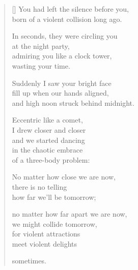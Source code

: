 \documentclass[12pt,a4paper]{article}
\begin{document}
\thispagestyle{empty}


\settowidth{\versewidth}{born of a violent collision long ago.}

\bigskip

\begin{verse}[\versewidth]
You had left the silence before you, \\
born of a violent collision long ago.

In seconds, they were circling you \\
at the night party, \\
admiring you like a clock tower, \\
wasting your time.

Suddenly I saw your bright face \\
fill up when our hands aligned, \\
and high noon struck behind midnight.

Eccentric like a comet, \\
I drew closer and closer \\
and we started dancing \\
in the chaotic embrace \\
of a three-body problem:

No matter how close we are now, \\
there is no telling \\
how far we'll be tomorrow;

no matter how far apart we are now, \\
we might collide tomorrow, \\
for violent attractions \\
meet violent delights

sometimes.
\end{verse}
\end{document}
